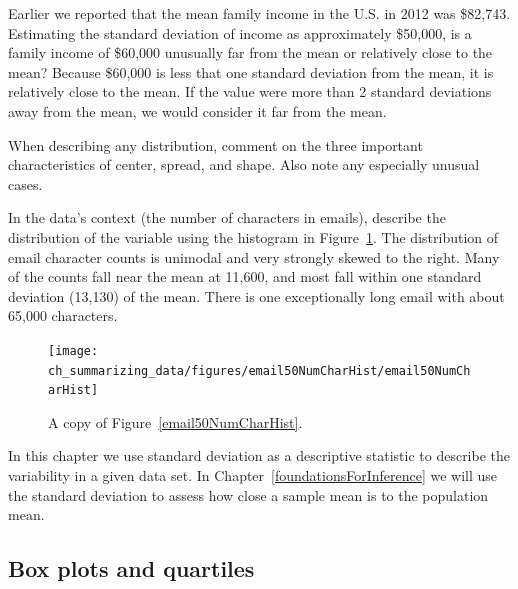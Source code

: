 \begin{example}{Earlier we reported that the mean family income in the U.S. in 2012 was \$82,743. Estimating the standard deviation of income as approximately \$50,000, is a family income of \$60,000 unusually far from the mean or relatively close to the mean?}
Because \$60,000 is less that one standard deviation from the mean, it is relatively close to the mean. If the value were more than 2 standard deviations away from the mean, we would consider it far from the mean.
\end{example}

When describing any distribution, comment on the three important characteristics of center, spread, and shape. Also note any especially unusual cases.

\begin{example}{In the data's context (the number of characters in emails), describe the distribution of the  variable using the histogram in Figure~\ref{email50NumCharHistCopy}.}
The distribution of email character counts is unimodal and very strongly skewed to the right. Many of the counts fall near the mean at 11,600, and most fall within one standard deviation (13,130) of the mean. There is one exceptionally long email with about 65,000 characters.

\begin{figure}
   \centering
   \texttt{[image: ch\_summarizing\_data/figures/email50NumCharHist/email50NumCharHist]}
   \caption{A copy of Figure~\ref{email50NumCharHist}.}
   \label{email50NumCharHistCopy}
\end{figure}

\end{example}

In this chapter we use standard deviation as a descriptive statistic to describe the variability in a given data set. In Chapter~\ref{foundationsForInference} we will use the standard deviation to assess how close a sample mean is to the population mean.



\subsection{Box plots and quartiles}

